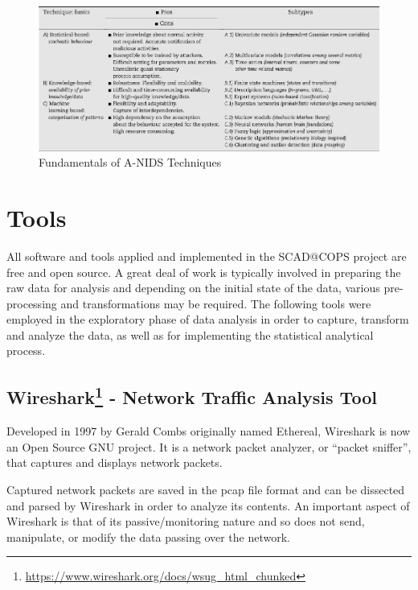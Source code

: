 \documentclass[11pt,]{article}
\let\rmarkdownfootnote\footnote%
\def\footnote{\protect\rmarkdownfootnote}
\begin{document}
\begin{figure}

{\centering \includegraphics{thesis_files/figure-latex/unnamed-chunk-11-1} 

}

\caption{Fundamentals of A-NIDS Techniques}\label{fig:unnamed-chunk-11}
\end{figure}

\clearpage

\section{Tools}\label{tools}

All software and tools applied and implemented in the SCAD@COPS project
are free and open source. A great deal of work is typically involved in
preparing the raw data for analysis and depending on the initial state
of the data, various pre-processing and transformations may be required.
The following tools were employed in the exploratory phase of data
analysis in order to capture, transform and analyze the data, as well as
for implementing the statistical analytical process.

\subsection[Wireshark - Network Traffic Analysis
Tool]{Wireshark\footnote{\url{https://www.wireshark.org/docs/wsug_html_chunked}}
- Network Traffic Analysis
Tool}\label{wireshark2---network-traffic-analysis-tool}

Developed in 1997 by Gerald Combs originally named Ethereal, Wireshark
is now an Open Source GNU project. It is a network packet analyzer, or
``packet sniffer'', that captures and displays network packets.

Captured network packets are saved in the pcap file format and can be
dissected and parsed by Wireshark in order to analyze its contents. An
important aspect of Wireshark is that of its passive/monitoring nature
and so does not send, manipulate, or modify the data passing over the
network.
\end{document}
